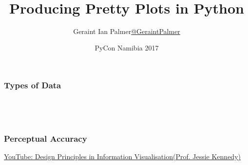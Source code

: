 \documentclass{beamer}
\title
{Producing Pretty Plots in Python}
\author{Geraint Ian Palmer\newline \footnotesize{\textcolor{orange}{\href{https://twitter.com/GeraintPalmer}{@GeraintPalmer}}}}
\date{PyCon Namibia 2017}
\begin{document}
\frame{\titlepage}

\begin{frame}
\frametitle{Types of Data}
\begin{columns}
\begin{column}{0.5\textwidth}
\begin{center}
\\

\end{center}
\end{column}
\begin{column}{0.5\textwidth}
\begin{center}
\\

\end{center}
\end{column}
\end{columns}
\end{frame}

\begin{frame}
\frametitle{Perceptual Accuracy}
\begin{center}

\textcolor{orange}{\small{\href{https://youtu.be/k_lvjRCOpJk?list=PLpX1jXuNTXGrjl6CxJ6Cly1GKO1su9yeD}{YouTube: Design Principles in Information Visualisation\newline (Prof. Jessie Kennedy)}}}
\end{center}
\end{frame}
\end{document}
